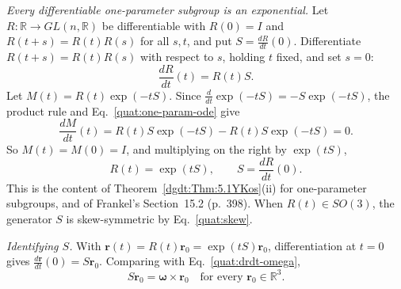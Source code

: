 \emph{Every differentiable one-parameter subgroup is an exponential.} Let
$R\colon\mathbb R\to GL(n,\mathbb R)$ be differentiable with $R(0)=I$ and
$R(t+s)=R(t)R(s)$ for all $s,t$, and put $S=\frac{dR}{dt}(0)$. Differentiate
$R(t+s)=R(t)R(s)$ with respect to $s$, holding $t$ fixed, and set $s=0$:
\begin{equation}\label{quat:one-param-ode}
 \frac{dR}{dt}(t)=R(t)S .
\end{equation}
Let $M(t)=R(t)\exp(-tS)$. Since
$\frac{d}{dt}\exp(-tS)=-S\exp(-tS)$, the product rule and
Eq.~\eqref{quat:one-param-ode} give
\begin{equation}
 \frac{dM}{dt}(t)=R(t)S\exp(-tS)-R(t)S\exp(-tS)=0 .
\end{equation}
So $M(t)=M(0)=I$, and multiplying on the right by $\exp(tS)$,
\begin{equation}\label{quat:one-param-exp}
 R(t)=\exp(tS),\qquad S=\frac{dR}{dt}(0).
\end{equation}
This is the content of Theorem~\ref{dgdt:Thm:5.1YKos}(ii) for one-parameter
subgroups, and of Frankel's Section~15.2 (p.~398). When $R(t)\in SO(3)$, the
generator $S$ is skew-symmetric by Eq.~\eqref{quat:skew}.

\emph{Identifying $S$.} With $\mathbf r(t)=R(t)\mathbf r_0
=\exp(tS)\mathbf r_0$, differentiation at $t=0$ gives
$\frac{d\mathbf r}{dt}(0)=S\mathbf r_0$. Comparing with
Eq.~\eqref{quat:drdt-omega},
\begin{equation}\label{quat:S-omega}
 S\mathbf r_0=\boldsymbol\omega\times\mathbf r_0
 \quad\text{for every }\mathbf r_0\in\mathbb R^3 .
\end{equation}

